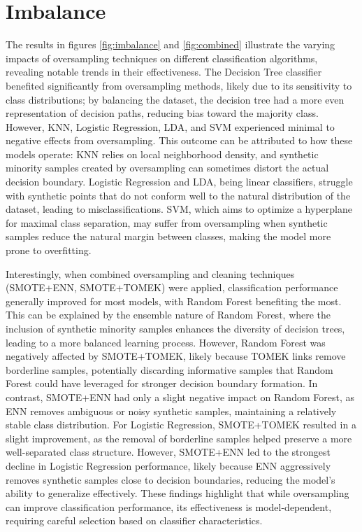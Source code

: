 \documentclass[letterpaper, notitlepage]{report}
\begin{document}
\section{Imbalance}
The results in figures \ref{fig:imbalance} and \ref{fig:combined} illustrate the varying impacts of oversampling techniques on different classification algorithms, revealing notable trends in their effectiveness. The Decision Tree classifier benefited significantly from oversampling methods, likely due to its sensitivity to class distributions; by balancing the dataset, the decision tree had a more even representation of decision paths, reducing bias toward the majority class. However, KNN, Logistic Regression, LDA, and SVM experienced minimal to negative effects from oversampling. This outcome can be attributed to how these models operate: KNN relies on local neighborhood density, and synthetic minority samples created by oversampling can sometimes distort the actual decision boundary. Logistic Regression and LDA, being linear classifiers, struggle with synthetic points that do not conform well to the natural distribution of the dataset, leading to misclassifications. SVM, which aims to optimize a hyperplane for maximal class separation, may suffer from oversampling when synthetic samples reduce the natural margin between classes, making the model more prone to overfitting.

Interestingly, when combined oversampling and cleaning techniques (SMOTE+ENN, SMOTE+TOMEK) were applied, classification performance generally improved for most models, with Random Forest benefiting the most. This can be explained by the ensemble nature of Random Forest, where the inclusion of synthetic minority samples enhances the diversity of decision trees, leading to a more balanced learning process. However, Random Forest was negatively affected by SMOTE+TOMEK, likely because TOMEK links remove borderline samples, potentially discarding informative samples that Random Forest could have leveraged for stronger decision boundary formation. In contrast, SMOTE+ENN had only a slight negative impact on Random Forest, as ENN removes ambiguous or noisy synthetic samples, maintaining a relatively stable class distribution. For Logistic Regression, SMOTE+TOMEK resulted in a slight improvement, as the removal of borderline samples helped preserve a more well-separated class structure. However, SMOTE+ENN led to the strongest decline in Logistic Regression performance, likely because ENN aggressively removes synthetic samples close to decision boundaries, reducing the model’s ability to generalize effectively. These findings highlight that while oversampling can improve classification performance, its effectiveness is model-dependent, requiring careful selection based on classifier characteristics.
\end{document}
